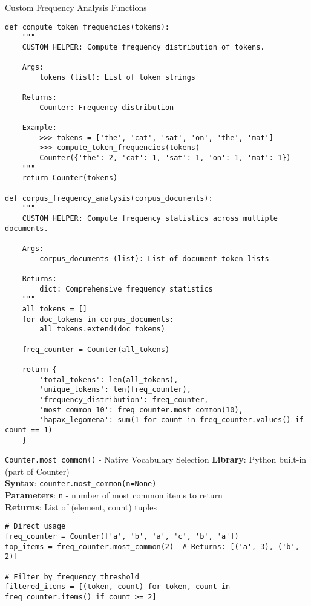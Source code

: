 \documentclass[11pt,a4paper]{article}
\begin{document}
\begin{custombox}{Custom Frequency Analysis Functions}

\begin{lstlisting}[caption=Custom frequency computation helpers]
def compute_token_frequencies(tokens):
    """
    CUSTOM HELPER: Compute frequency distribution of tokens.
    
    Args:
        tokens (list): List of token strings
        
    Returns:
        Counter: Frequency distribution
        
    Example:
        >>> tokens = ['the', 'cat', 'sat', 'on', 'the', 'mat']
        >>> compute_token_frequencies(tokens)
        Counter({'the': 2, 'cat': 1, 'sat': 1, 'on': 1, 'mat': 1})
    """
    return Counter(tokens)

def corpus_frequency_analysis(corpus_documents):
    """
    CUSTOM HELPER: Compute frequency statistics across multiple documents.
    
    Args:
        corpus_documents (list): List of document token lists
        
    Returns:
        dict: Comprehensive frequency statistics
    """
    all_tokens = []
    for doc_tokens in corpus_documents:
        all_tokens.extend(doc_tokens)
    
    freq_counter = Counter(all_tokens)
    
    return {
        'total_tokens': len(all_tokens),
        'unique_tokens': len(freq_counter),
        'frequency_distribution': freq_counter,
        'most_common_10': freq_counter.most_common(10),
        'hapax_legomena': sum(1 for count in freq_counter.values() if count == 1)
    }
\end{lstlisting}
\end{custombox}

\begin{nativebox}{\texttt{Counter.most\_common()} - Native Vocabulary Selection}
\textbf{Library}: Python built-in (part of Counter) \\
\textbf{Syntax}: \texttt{counter.most\_common(n=None)} \\
\textbf{Parameters}: \texttt{n} - number of most common items to return \\
\textbf{Returns}: List of (element, count) tuples

\begin{lstlisting}[caption=Direct vocabulary selection]
# Direct usage
freq_counter = Counter(['a', 'b', 'a', 'c', 'b', 'a'])
top_items = freq_counter.most_common(2)  # Returns: [('a', 3), ('b', 2)]

# Filter by frequency threshold
filtered_items = [(token, count) for token, count in freq_counter.items() if count >= 2]
\end{lstlisting}
\end{nativebox}
\end{document}
